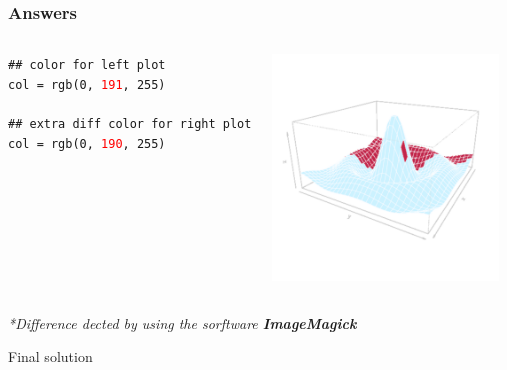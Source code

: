 \documentclass{beamer}
\begin{document}
\begin{frame}[fragile]
\frametitle{Answers}

\begin{columns}

\texttt{\textcolor{codegreen}{\#\# color for left plot}}\\
\texttt{col = rgb(0, \textcolor{red}{191}, 255)} \\~\\

\texttt{\textcolor{codegreen}{\#\# extra diff color for right plot}}\\
\texttt{col = rgb(0, \textcolor{red}{190}, 255)}


\begin{center}
\includegraphics[height = 6cm, width = 6cm]{plot/persp_diff_3.pdf}
\end{center}

\end{columns}

\hfill \textit{*Difference dected by using the sorftware \textbf{ImageMagick}}

\end{frame}




\begin{frame}
\begin{center}
\Huge Final solution
\end{center}
\end{frame}
\end{document}
